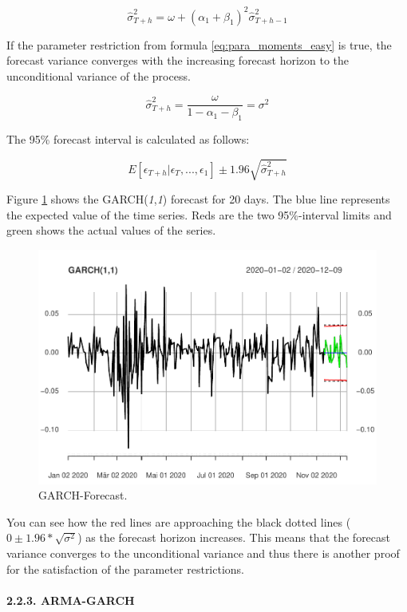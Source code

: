 \documentclass[
]{article}
\begin{document}
\[\hat{\sigma}_{T+h}^{2}=\omega+(\alpha_{1}+\beta_{1})^{2}\hat{\sigma}_{T+h-1}^{2}\]

If the parameter restriction from formula \ref{eq:para_moments_easy} is
true, the forecast variance converges with the increasing forecast
horizon to the unconditional variance of the process.

\[\hat{\sigma}_{T+h}^{2}=\frac{\omega}{1-\alpha_{1}-\beta_{1}}=\sigma^{2}\]

\newpage

The 95\% forecast interval is calculated as follows:

\[E[\epsilon_{T+h} | \epsilon_{T},...,\epsilon_{1}]\pm 1.96\sqrt{\hat{\sigma}_{T+h}^{2}}\]

Figure \ref{fig:chap2.2.3} shows the GARCH(\emph{1},\emph{1}) forecast
for 20 days. The blue line represents the expected value of the time
series. Reds are the two 95\%-interval limits and green shows the actual
values of the series.

\begin{figure}

{\centering \includegraphics[width=0.7\linewidth]{00_main_files/figure-latex/chap2.2.3-1} 

}

\caption{GARCH-Forecast.}\label{fig:chap2.2.3}
\end{figure}

You can see how the red lines are approaching the black dotted lines
(\(0 \pm 1.96*\sqrt{\sigma^{2}}\)) as the forecast horizon increases.
This means that the forecast variance converges to the unconditional
variance and thus there is another proof for the satisfaction of the
parameter restrictions.

\hypertarget{arma-garch-section}{%
\paragraph{2.2.3. ARMA-GARCH}\label{arma-garch-section}}
\end{document}
